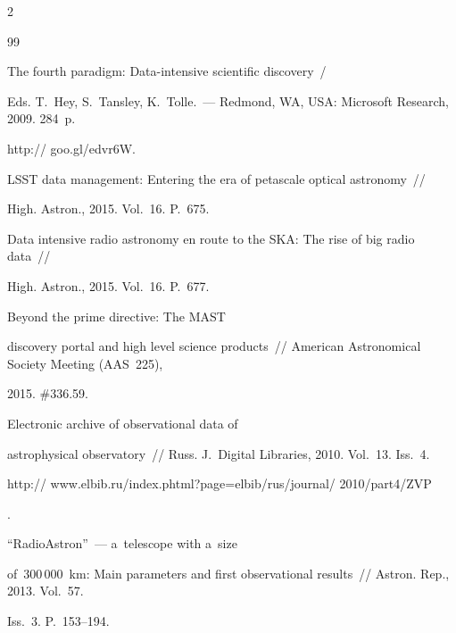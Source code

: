 \begin{multicols}{2}
{ {%




 \begin{thebibliography}{99}







The fourth paradigm: Data-intensive scientific discovery~/


Eds. T.~Hey, S.~Tansley, K.~Tolle.~--- Redmond, WA, USA: Microsoft Research, 2009. 284~p.


{\sf http:// goo.gl/edvr6W}.




 LSST data management: Entering the era of petascale optical astronomy~// 


High. Astron., 2015. Vol.~16. P.~675.




 Data intensive radio astronomy en route to the SKA: The rise of big radio data~// 


High. Astron., 2015. Vol.~16. P.~677.




 Beyond the prime directive: The MAST 


discovery portal and high level science products~// American Astronomical Society Meeting (AAS~225), 


2015. \#336.59. 




 Electronic archive of observational data of 


astrophysical observatory~// Russ. J.~Digital Libraries, 2010. Vol.~13. Iss.~4. {\sf 


http:// www.elbib.ru/index.phtml?page=elbib/rus/journal/ 2010/part4/ZVP}.






``RadioAstron''~--- a~telescope with a~size 


of~300\,000~km: Main parameters and first observational results~// Astron. Rep., 2013. Vol.~57. 


Iss.~3. P.~153--194.





\end{thebibliography}}}
\end{multicols}
